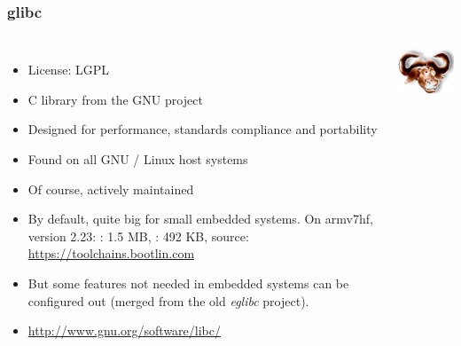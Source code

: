 \begin{frame}
  \frametitle{glibc}
  \begin{columns}
    \begin{itemize}
    \item License: LGPL
    \item C library from the GNU project
    \item Designed for performance, standards compliance and portability
    \item Found on all GNU / Linux host systems
    \item Of course, actively maintained
    \item By default, quite big for small embedded systems.
      On armv7hf, version 2.23: : 1.5 MB, : 492
      KB, source: \url{https://toolchains.bootlin.com}
    \item But some features not needed in embedded systems can be
          configured out (merged from the old {\em eglibc} project).
    \item \url{http://www.gnu.org/software/libc/}
    \end{itemize}
    \includegraphics[width=\textwidth]{slides/c-libraries/glibc.png}
  \end{columns}
\end{frame}

